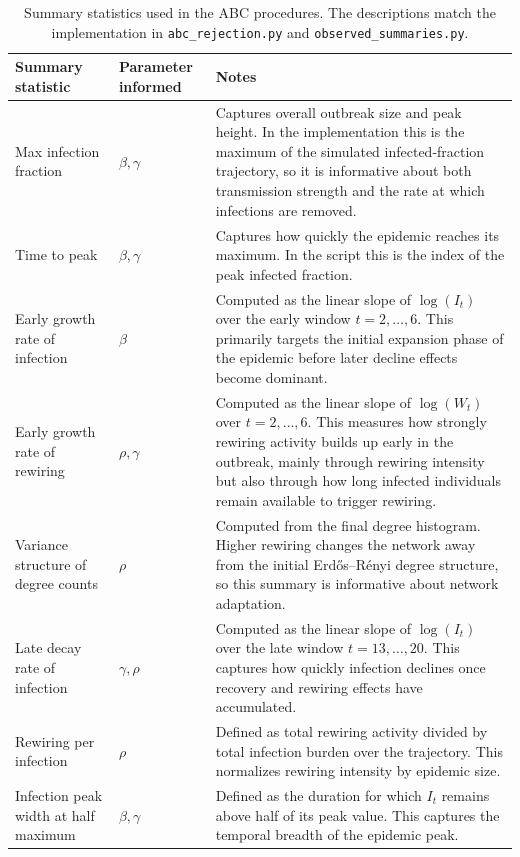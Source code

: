 \documentclass[11pt]{article}
\begin{document}
\begin{table}[H]
\centering
\caption{Summary statistics used in the ABC procedures. The descriptions match the implementation in \texttt{abc\_rejection.py} and \texttt{observed\_summaries.py}.}
\label{tab:summary-statistics-role}
\begin{tabular}{>{\raggedright\arraybackslash}p{} >{\raggedright\arraybackslash}p{} >{\raggedright\arraybackslash}p{}}
\toprule
Summary statistic & Parameter informed & Notes \\
\midrule
Max infection fraction & $\beta, \gamma$ & Captures overall outbreak size and peak height. In the implementation this is the maximum of the simulated infected-fraction trajectory, so it is informative about both transmission strength and the rate at which infections are removed. \\
Time to peak & $\beta, \gamma$ & Captures how quickly the epidemic reaches its maximum. In the script this is the index of the peak infected fraction. \\
Early growth rate of infection & $\beta$ & Computed as the linear slope of $\log(I_t)$ over the early window $t=2,\dots,6$. This primarily targets the initial expansion phase of the epidemic before later decline effects become dominant. \\
Early growth rate of rewiring & $\rho, \gamma$ & Computed as the linear slope of $\log(W_t)$ over $t=2,\dots,6$. This measures how strongly rewiring activity builds up early in the outbreak, mainly through rewiring intensity but also through how long infected individuals remain available to trigger rewiring. \\
Variance structure of degree counts & $\rho$ & Computed from the final degree histogram. Higher rewiring changes the network away from the initial Erd\H{o}s--R\'enyi degree structure, so this summary is informative about network adaptation. \\
Late decay rate of infection & $\gamma, \rho$ & Computed as the linear slope of $\log(I_t)$ over the late window $t=13,\dots,20$. This captures how quickly infection declines once recovery and rewiring effects have accumulated. \\
Rewiring per infection & $\rho$ & Defined as total rewiring activity divided by total infection burden over the trajectory. This normalizes rewiring intensity by epidemic size. \\
Infection peak width at half maximum & $\beta, \gamma$ & Defined as the duration for which $I_t$ remains above half of its peak value. This captures the temporal breadth of the epidemic peak. \\
\bottomrule
\end{tabular}
\end{table}
\end{document}
